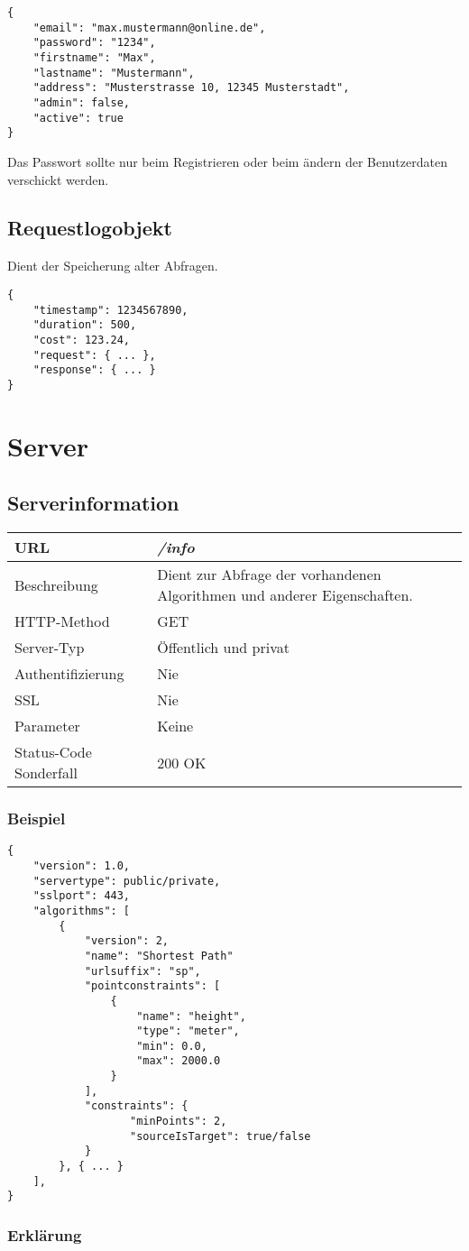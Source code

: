 \documentclass[ngerman,titlepage,parskip=true]{scrartcl}
\newcommand{\requestURL}[1]{\textit{#1}}
\newcommand{\request}[9]
{\subsection{#1}
\begin{tabular}{|p{0.2\textwidth}|p{0.7\textwidth}|}
\hline
  URL & \requestURL{#2}\\\hline
    Beschreibung & #3\\\hline
  HTTP-Method & #4\\\hline
  Server-Typ & #5\\\hline
  Authentifizierung & #6\\\hline
  SSL & #7\\\hline
  Parameter & #8\\\hline
  Status-Code Sonderfall & #9\\\hline
 \end{tabular}\vspace*{1em}}
{}%
{}%
{}%
{}%
{}%
{}%
{}%
{}%
\begin{document}
\begin{lstlisting}
{
	"email": "max.mustermann@online.de",
	"password": "1234",
	"firstname": "Max",
	"lastname": "Mustermann",
	"address": "Musterstrasse 10, 12345 Musterstadt",
	"admin": false,
	"active": true
}
\end{lstlisting}	
	Das Passwort sollte nur beim Registrieren oder beim ändern der Benutzerdaten verschickt werden.
	\subsection{Requestlogobjekt}	
	Dient der Speicherung alter Abfragen.
	\label{requestlogobjekt}

\begin{lstlisting}
{
	"timestamp": 1234567890,
	"duration": 500,
	"cost": 123.24,
	"request": { ... },
	"response": { ... }
}
\end{lstlisting}

\clearpage
\section{Server}

\request{Serverinformation}
{/info}
{Dient zur Abfrage der vorhandenen Algorithmen und anderer Eigenschaften.}
{GET}
{Öffentlich und privat}
{Nie}
{Nie}
{Keine}
{200 OK}
\subsubsection{Beispiel}
	
	\begin{lstlisting}
{
    "version": 1.0,
    "servertype": public/private,
    "sslport": 443,
    "algorithms": [
        {
            "version": 2,
            "name": "Shortest Path"
            "urlsuffix": "sp",
            "pointconstraints": [                    
                {
                    "name": "height",
                    "type": "meter",
                    "min": 0.0,
                    "max": 2000.0
                }
            ],
            "constraints": {
                   "minPoints": 2,
                   "sourceIsTarget": true/false 
            }
        }, { ... }
    ],
}
    \end{lstlisting}
    \subsubsection*{Erklärung}
    
\end{document}
